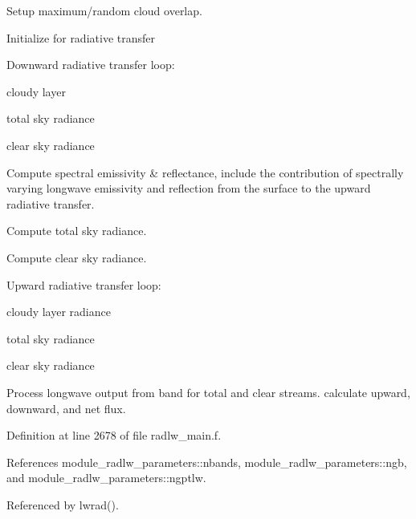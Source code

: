 \begin{DoxyEnumerate}
\item Setup maximum/random cloud overlap.
\item Initialize for radiative transfer
\item Downward radiative transfer loop\+:
\begin{DoxyItemize}
\item cloudy layer
\item total sky radiance
\item clear sky radiance
\end{DoxyItemize}
\item Compute spectral emissivity \& reflectance, include the contribution of spectrally varying longwave emissivity and reflection from the surface to the upward radiative transfer.
\item Compute total sky radiance.
\item Compute clear sky radiance.
\item Upward radiative transfer loop\+:
\begin{DoxyItemize}
\item cloudy layer radiance
\item total sky radiance
\item clear sky radiance
\end{DoxyItemize}
\item Process longwave output from band for total and clear streams. calculate upward, downward, and net flux. 
\end{DoxyEnumerate}

Definition at line 2678 of file radlw\+\_\+main.\+f.



References module\+\_\+radlw\+\_\+parameters\+::nbands, module\+\_\+radlw\+\_\+parameters\+::ngb, and module\+\_\+radlw\+\_\+parameters\+::ngptlw.



Referenced by lwrad().

\mbox{\label{group__module__radlw__main_gaeb7b74288cf87988c14bf6e24a2039ae}} 
